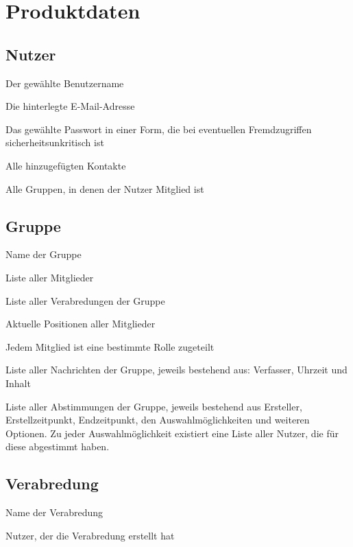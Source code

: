 \documentclass[parskip=full,11pt]{scrartcl}
\begin{document}
\pagebreak
\section{Produktdaten}
\subsection{Nutzer}
Der gewählte Benutzername

Die hinterlegte E-Mail-Adresse

Das gewählte Passwort in einer Form, die bei eventuellen Fremdzugriffen sicherheitsunkritisch ist

Alle hinzugefügten Kontakte

Alle Gruppen, in denen der Nutzer Mitglied ist

\subsection{Gruppe}
Name der Gruppe

Liste aller Mitglieder

Liste aller Verabredungen der Gruppe

Aktuelle Positionen aller Mitglieder

Jedem Mitglied ist eine bestimmte Rolle zugeteilt

Liste aller Nachrichten der Gruppe, jeweils bestehend aus: Verfasser, Uhrzeit und Inhalt

Liste aller Abstimmungen der Gruppe, jeweils bestehend aus Ersteller, Erstellzeitpunkt, Endzeitpunkt, den Auswahlmöglichkeiten und weiteren Optionen. Zu jeder Auswahlmöglichkeit existiert eine Liste aller Nutzer, die für diese abgestimmt haben.

\subsection{Verabredung}
Name der Verabredung

Nutzer, der die Verabredung erstellt hat
\end{document}
